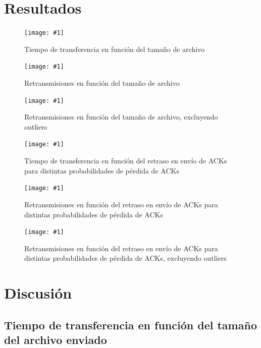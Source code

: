 \documentclass[a4paper, 10pt, twoside]{article}
\newcommand{\grafico}[3]{
  \begin{figure}[H]
    \texttt{[image: \#1]}
    \caption{#2}
    \label{#3}
  \end{figure}
}
\begin{document}


\section{Resultados}
\label{sec:resultados}

\grafico{time_vs_size}
        {Tiempo de transferencia en función del tamaño de archivo}
        {plot:time_vs_size}

\grafico{retransmissions_vs_size}
        {Retransmisiones en función del tamaño de archivo}
        {plot:retransmissions_vs_size}

\grafico{retransmissions_vs_size_wo_outliers}
        {Retransmisiones en función del tamaño de archivo, excluyendo outliers}
        {plot:retransmissions_vs_size_wo_outliers}

\grafico{time_vs_delay_and_loss_probability}
        {Tiempo de transferencia en función del retraso en envío de ACKs para distintas probabilidades de pérdida de ACKs}
        {plot:time_vs_delay_and_loss_probability}

\grafico{retransmissions_vs_delay_and_loss_probability}
        {Retransmisiones en función del retraso en envío de ACKs para distintas probabilidades de pérdida de ACKs}
        {plot:retransmissions_vs_delay_and_loss_probability}

\grafico{retransmissions_vs_delay_and_loss_probability_wo_outliers}
        {Retransmisiones en función del retraso en envío de ACKs para distintas probabilidades de pérdida de ACKs, excluyendo outliers}
        {plot:retransmissions_vs_delay_and_loss_probability_wo_outliers}




\section{Discusión}
\label{sec:discusion}


\subsection{Tiempo de transferencia en función del tamaño del archivo enviado}
\end{document}
